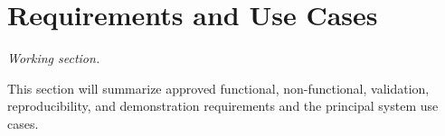 \section{Requirements and Use Cases}
\label{sec:requirements}

\textit{Working section.}

This section will summarize approved functional, non-functional, validation,
reproducibility, and demonstration requirements and the principal system use cases.
